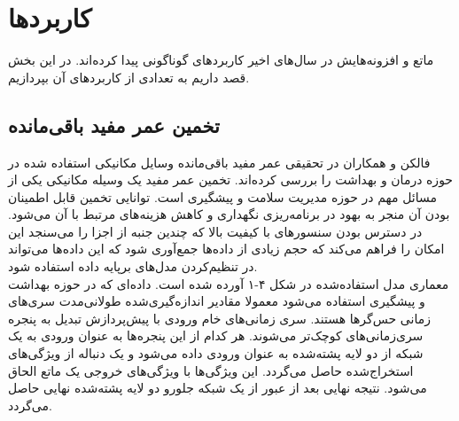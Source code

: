 \chapter{کاربردها}
ماتع و افزونه‌هایش در سال‌های اخیر کاربردهای گوناگونی پیدا کرده‌اند. در این بخش قصد داریم به تعدادی از کاربردهای آن بپردازیم.

\section{تخمین عمر مفید باقی‌مانده}
فالکن و همکاران\cite{falcon2020neural} در تحقیقی عمر مفید باقی‌مانده وسایل مکانیکی استفاده شده در حوزه درمان و بهداشت را بررسی کرده‌اند. تخمین عمر مفید یک وسیله مکانیکی یکی از مسائل مهم در حوزه مدیریت سلامت و پیشگیری است. توانایی تخمین قابل اطمینان بودن آن منجر به بهود در برنامه‌ریزی نگهداری و کاهش هزینه‌های مرتبط با آن می‌شود. در دسترس بودن سنسورهای با کیفیت بالا که چندین جنبه از اجزا را می‌سنجد این امکان را فراهم می‌کند که حجم زیادی از داده‌ها جمع‌آوری شود که این داده‌ها می‌تواند در تنظیم‌کردن مدل‌های برپایه داده استفاده شود.\cite{falcon2020neural}
\\

معماری مدل استفاده‌شده در شکل ۴-۱ آورده شده است. داده‌ای که در حوزه بهداشت و پیشگیری استفاده می‌شود معمولا مقادیر اندازه‌گیری‌شده طولانی‌مدت سری‌های زمانی حس‌گرها هستند. 
سری زمانی‌های خام ورودی با پیش‌پردازش تبدیل به پنجره سری‌زمانی‌های کوچک‌تر می‌شوند. هر کدام از این پنجره‌ها به عنوان ورودی به یک شبکه از دو لایه پشته‌شده  به عنوان ورودی داده می‌شود و یک دنباله از ویژگی‌های استخراج‌شده حاصل می‌گردد. این ویژگی‌ها با ویژگی‌های خروجی یک ماتع الحاق می‌شود. نتیجه نهایی بعد از عبور از یک شبکه جلورو دو لایه پشته‌شده نهایی حاصل می‌گردد.\cite{falcon2020neural}
\\

